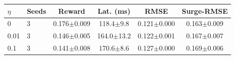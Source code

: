\begin{tabular}{llcccc}
\toprule
$\eta$ & Seeds & Reward & Lat. (ms) & RMSE & Surge-RMSE \\
\midrule
0 & 3 & 0.176{\tiny$\pm$0.009} & 118.4{\tiny$\pm$9.8} & 0.121{\tiny$\pm$0.000} & 0.163{\tiny$\pm$0.009} \\
0.01 & 3 & 0.146{\tiny$\pm$0.005} & 164.0{\tiny$\pm$13.2} & 0.122{\tiny$\pm$0.001} & 0.167{\tiny$\pm$0.007} \\
0.1 & 3 & 0.141{\tiny$\pm$0.008} & 170.6{\tiny$\pm$8.6} & 0.127{\tiny$\pm$0.000} & 0.169{\tiny$\pm$0.006} \\
\bottomrule
\end{tabular}

